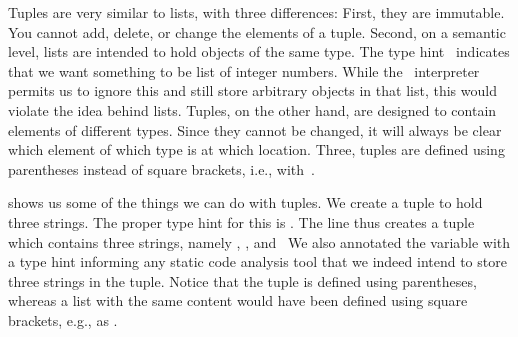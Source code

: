 %
\label{sec:tuples}%
%
%
%
%
%
%
%
%
%
%
Tuples are very similar to lists, with three differences:
First, they are immutable.
You cannot add, delete, or change the elements of a tuple.
Second, on a semantic level, lists are intended to hold objects of the same type.
The type hint~ indicates that we want something to be list of integer numbers.
While the \python\ interpreter permits us to ignore this and still store arbitrary objects in that list, this would violate the idea behind lists.
Tuples, on the other hand, are designed to contain elements of different types.
Since they cannot be changed, it will always be clear which element of which type is at which location.
Three, tuples are defined using parentheses instead of square brackets, i.e., with~.%
%
%
%
\begin{sloppypar}%
 shows us some of the things we can do with tuples.
We create a tuple  to hold three strings.
The proper type hint for this is .
The line  thus creates a tuple~ which contains three strings, namely , , and~
We also annotated the variable with a type hint informing any static code analysis tool that we indeed intend to store three strings in the tuple.
Notice that the tuple is defined using parentheses, whereas a list with the same content would have been defined using square brackets, e.g., as .%
\end{sloppypar}%
